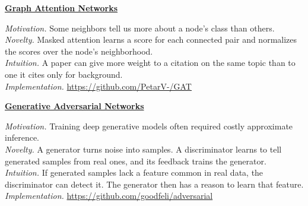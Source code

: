 \documentclass[11pt,a4paper]{article}
\newcommand{\paper}[2]{\par\addvspace{4pt}\textbf{\href{#1}{#2}}\par\nobreak}
\begin{document}
\paper{https://arxiv.org/abs/1710.10903}{Graph Attention Networks}
\textit{Motivation.} Some neighbors tell us more about a node's class than others.\\
\textit{Novelty.} Masked attention learns a score for each connected pair and normalizes the scores over the node's neighborhood.\\
\textit{Intuition.} A paper can give more weight to a citation on the same topic than to one it cites only for background.\\
\textit{Implementation.} \url{https://github.com/PetarV-/GAT}

\paper{https://arxiv.org/abs/1406.2661}{Generative Adversarial Networks}
\textit{Motivation.} Training deep generative models often required costly approximate inference.\\
\textit{Novelty.} A generator turns noise into samples. A discriminator learns to tell generated samples from real ones, and its feedback trains the generator.\\
\textit{Intuition.} If generated samples lack a feature common in real data, the discriminator can detect it. The generator then has a reason to learn that feature.\\
\textit{Implementation.} \url{https://github.com/goodfeli/adversarial}
\end{document}
